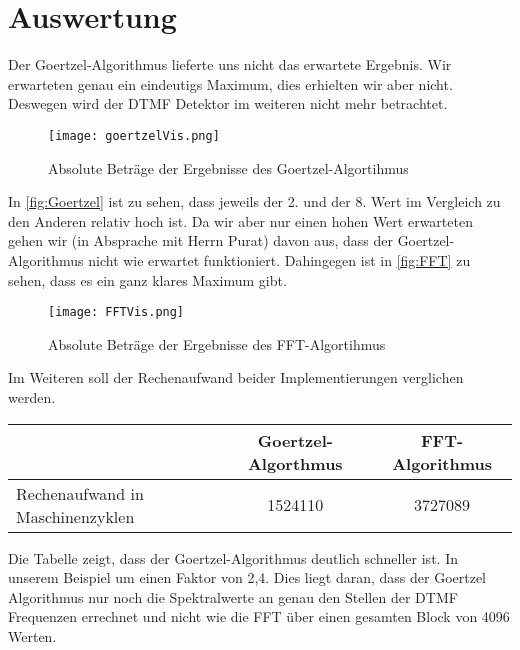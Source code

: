 \section{Auswertung}
Der Goertzel-Algorithmus lieferte uns nicht das erwartete Ergebnis. Wir erwarteten genau ein eindeutigs Maximum, dies erhielten wir aber nicht. Deswegen wird der DTMF Detektor im weiteren nicht mehr betrachtet.
\begin{figure}[H]
	\texttt{[image: goertzelVis.png]}
  \caption{Absolute Beträge der Ergebnisse des Goertzel-Algortihmus}
  \label{fig:Goertzel}
\end{figure}
In \autoref{fig:Goertzel} ist zu sehen, dass jeweils der 2. und der 8. Wert im Vergleich zu den Anderen relativ hoch ist. Da wir aber nur einen hohen Wert erwarteten gehen wir (in Absprache mit Herrn Purat) davon aus, dass der Goertzel-Algorithmus nicht wie erwartet funktioniert.
Dahingegen ist in \autoref{fig:FFT} zu sehen, dass es ein ganz klares Maximum gibt.
\begin{figure}[H]
	\texttt{[image: FFTVis.png]}
  \caption{Absolute Beträge der Ergebnisse des FFT-Algortihmus}
  \label{fig:FFT}
\end{figure}
Im Weiteren soll der Rechenaufwand beider Implementierungen verglichen werden.
\begin{center}
	\begin{tabular}{l|c|c}
	 & Goertzel-Algorthmus & FFT-Algorithmus \\ \hline
	 Rechenaufwand in Maschinenzyklen & 1524110 & 3727089
	\end{tabular}
\end{center} 
Die Tabelle zeigt, dass der Goertzel-Algorithmus deutlich schneller ist. In unserem Beispiel um einen Faktor von 2,4. Dies liegt daran, dass der Goertzel Algorithmus nur noch die Spektralwerte an genau den Stellen der DTMF Frequenzen errechnet und nicht wie die FFT über einen gesamten Block von 4096 Werten.

